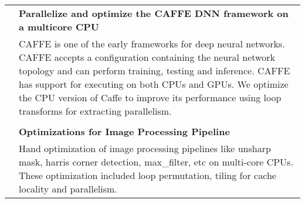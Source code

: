 \documentclass[a4paper,10pt]{article} %
\begin{document}
\begin{tabular}{rp{13cm}}
& \textbf{Parallelize and optimize the CAFFE DNN framework on a multicore CPU}\\
& \setlength{\leftskip}{0.4cm}
CAFFE is one of the early frameworks for deep neural networks. CAFFE accepts a configuration containing the neural network topology and can perform training, testing and inference. CAFFE has support for executing  on both CPUs and GPUs. We optimize the CPU version of Caffe to improve its performance using loop transforms for extracting parallelism.\\
&\\
& \textbf{Optimizations for Image Processing Pipeline} \\
& \setlength{\leftskip}{0.4cm}
Hand optimization of image processing pipelines like unsharp mask, harris corner detection, max\_filter, etc on multi-core CPUs. These optimization included loop permutation, tiling for cache locality and parallelism.\\
\end{tabular}
\end{document}
